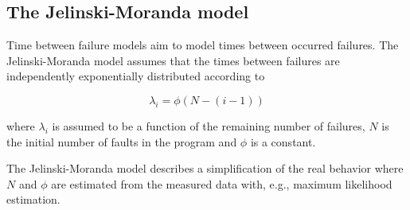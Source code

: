 \subsection{The Jelinski-Moranda model}
Time between failure models aim to model times between occurred failures. The Jelinski-Moranda model assumes that the times between failures are independently exponentially distributed according to 

$$\lambda_{i}=\phi(N-(i-1))$$

\noindent where $\lambda_{i}$ is assumed to be a function of the remaining number of failures, $N$ is the initial number of faults in the program and $\phi$ is a constant. 

The Jelinski-Moranda model describes a simplification of the real behavior where $N$ and $\phi$ are estimated from the measured data with, e.g., maximum likelihood estimation. 